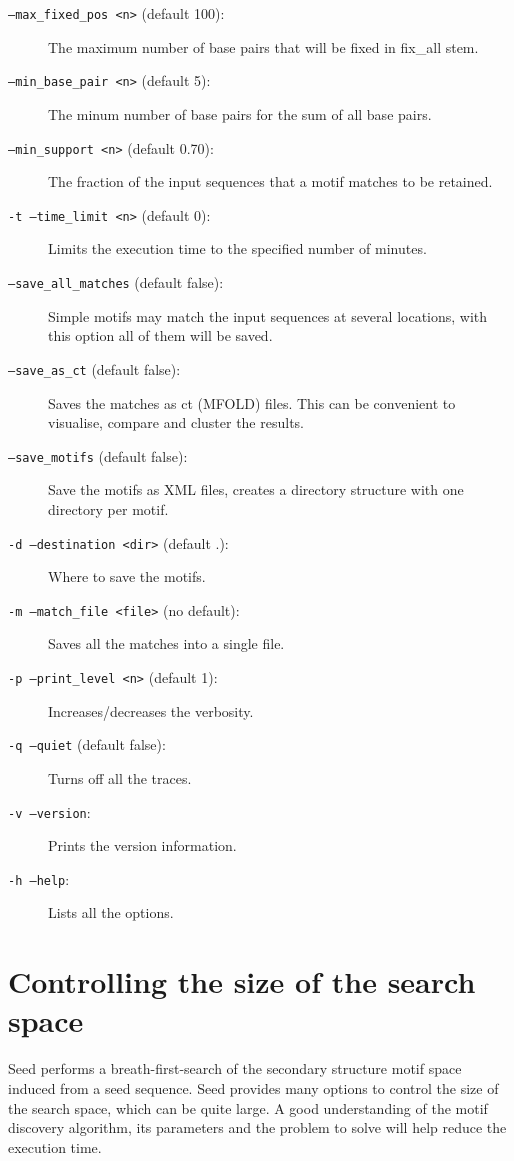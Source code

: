 \documentclass{article}
\begin{document}
\begin{description}
\item[\texttt{--max\_fixed\_pos <n>} (default 100):] The maximum
  number of
  base pairs that will be fixed in fix\_all stem.
\item[\texttt{--min\_base\_pair <n>} (default 5):] The minum number of
  base pairs for the sum of all base pairs.
\item[\texttt{--min\_support <n>} (default 0.70):] The fraction of the
  input sequences that a motif matches to be retained.
\item[\texttt{-t --time\_limit <n>} (default 0):] Limits the execution time
  to the specified number of minutes.
\item[\texttt{--save\_all\_matches} (default false):] Simple motifs
  may match the input sequences at several locations, with this option
  all of them will be saved.
\item[\texttt{--save\_as\_ct} (default false):] Saves the matches as
  ct (MFOLD) files. This can be convenient to visualise, compare and
  cluster the results.
\item[\texttt{--save\_motifs} (default false):] Save the motifs as XML
  files, creates a directory structure with one directory per motif.
\item[\texttt{-d --destination <dir>} (default .):] Where to save the motifs.
\item[\texttt{-m --match\_file <file>} (no default):] Saves all the
  matches into a single file.
\item[\texttt{-p --print\_level <n>} (default 1):] Increases/decreases
  the verbosity.
\item[\texttt{-q --quiet} (default false):] Turns off all the traces.
\item[\texttt{-v --version}:] Prints the version information.
\item[\texttt{-h --help}:] Lists all the options.
\end{description}

\section{Controlling the size of the search space}

Seed performs a breath-first-search of the secondary structure motif space
induced from a seed sequence.  Seed provides many options to control
the size of the search space, which can be quite large.  A good
understanding of the motif discovery algorithm, its parameters and the
problem to solve will help reduce the execution time.
\end{document}
